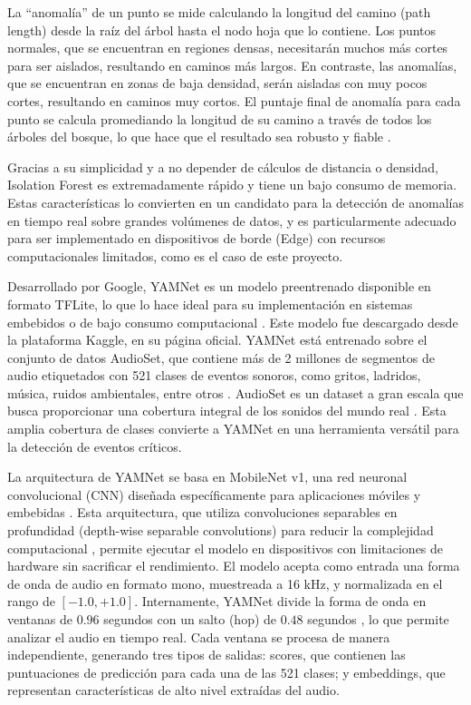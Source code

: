La ``anomalía'' de un punto se mide calculando la longitud del camino (path length) desde la raíz del árbol hasta el nodo hoja que lo contiene. Los puntos normales, que se encuentran en regiones densas, necesitarán muchos más cortes para ser aislados, resultando en caminos más largos. En contraste, las anomalías, que se encuentran en zonas de baja densidad, serán aisladas con muy pocos cortes, resultando en caminos muy cortos. El puntaje final de anomalía para cada punto se calcula promediando la longitud de su camino a través de todos los árboles del bosque, lo que hace que el resultado sea robusto y fiable \cite{liu2012isolation}.

Gracias a su simplicidad y a no depender de cálculos de distancia o densidad, Isolation Forest es extremadamente rápido y tiene un bajo consumo de memoria. Estas características lo convierten en un candidato para la detección de anomalías en tiempo real sobre grandes volúmenes de datos, y es particularmente adecuado para ser implementado en dispositivos de borde (Edge) con recursos computacionales limitados, como es el caso de este proyecto.


Desarrollado por Google, YAMNet es un modelo preentrenado disponible en formato TFLite, lo que lo hace ideal para su implementación en sistemas embebidos o de bajo consumo computacional \citeauthor{Google_yamnet} \citeyear{Google_yamnet}. Este modelo fue descargado desde la plataforma Kaggle, en su página oficial. YAMNet está entrenado sobre el conjunto de datos AudioSet, que contiene más de 2 millones de segmentos de audio etiquetados con 521 clases de eventos sonoros, como gritos, ladridos, música, ruidos ambientales, entre otros \citeauthor{Google_yamnet} \citeyear{Google_yamnet}. AudioSet es un dataset a gran escala que busca proporcionar una cobertura integral de los sonidos del mundo real \citeauthor{Gemmeke2017AudioSet} \citeyear{Gemmeke2017AudioSet}. Esta amplia cobertura de clases convierte a YAMNet en una herramienta versátil para la detección de eventos críticos.

La arquitectura de YAMNet se basa en MobileNet v1, una red neuronal convolucional (CNN) diseñada específicamente para aplicaciones móviles y embebidas \citeauthor{Google_yamnet} \citeyear{Google_yamnet}. Esta arquitectura, que utiliza convoluciones separables en profundidad (depth-wise separable convolutions) para reducir la complejidad computacional \citeauthor{Howard2017MobileNets} \citeyear{Howard2017MobileNets}, permite ejecutar el modelo en dispositivos con limitaciones de hardware sin sacrificar el rendimiento. El modelo acepta como entrada una forma de onda de audio en formato mono, muestreada a 16 kHz, y normalizada en el rango de $[-1.0, +1.0]$. Internamente, YAMNet divide la forma de onda en ventanas de $\text{0.96}$ segundos con un salto (hop) de $\text{0.48}$ segundos \citeauthor{Google_yamnet} \citeyear{Google_yamnet}, lo que permite analizar el audio en tiempo real. Cada ventana se procesa de manera independiente, generando tres tipos de salidas: scores, que contienen las puntuaciones de predicción para cada una de las 521 clases; y embeddings, que representan características de alto nivel extraídas del audio.


